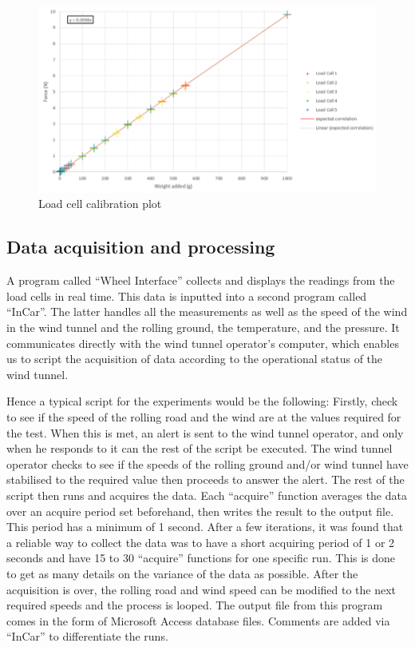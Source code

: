 \begin{figure}
    \centering
    \includegraphics{images/part10/loadcellcal.png}
    \caption{Load cell calibration plot}
    \label{fig:loadcellcalib}
\end{figure}

\subsection{Data acquisition and processing}

A program called “Wheel Interface” collects and displays the readings from the load cells in real time. This data is inputted into a second program called “InCar”. The latter handles all the measurements as well as the speed of the wind in the wind tunnel and the rolling ground, the temperature, and the pressure. It communicates directly with the wind tunnel operator’s computer, which enables us to script the acquisition of data according to the operational status of the wind tunnel.

Hence a typical script for the experiments would be the following: Firstly, check to see if the speed of the rolling road and the wind are at the values required for the test. When this is met, an alert is sent to the wind tunnel operator, and only when he responds to it can the rest of the script be executed. The wind tunnel operator checks to see if the speeds of the rolling ground and/or wind tunnel have stabilised to the required value then proceeds to answer the alert. The rest of the script then runs and acquires the data. Each “acquire” function averages the data over an acquire period set beforehand, then writes the result to the output file. This period has a minimum of 1 second. After a few iterations, it was found that a reliable way to collect the data was to have a short acquiring period of 1 or 2 seconds and have 15 to 30 “acquire” functions for one specific run. This is done to get as many details on the variance of the data as possible. After the acquisition is over, the rolling road and wind speed can be modified to the next required speeds and the process is looped. The output file from this program comes in the form of Microsoft Access database files. Comments are added via “InCar” to differentiate the runs.





